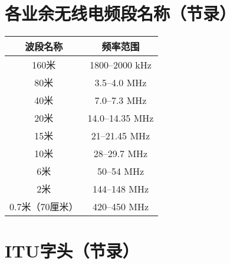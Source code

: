 \newpage






\section{各业余无线电频段名称（节录）}


\begin{longtable}{|c|c|}
	\hline
	\textbf{波段名称} & \textbf{频率范围} \\
	\hline
	160米 & 1800–2000 \si{\kHz} \\
	\hline
	80米 & 3.5–4.0 \si{\MHz} \\
	\hline
	40米 & 7.0–7.3 \si{\MHz} \\
	\hline
	20米 & 14.0–14.35 \si{\MHz} \\
	\hline
	15米 & 21–21.45 \si{\MHz} \\
	\hline
	10米 & 28–29.7 \si{\MHz} \\
	\hline
	6米 & 50–54 \si{\MHz} \\
	\hline
	2米 & 144–148 \si{\MHz} \\
	\hline
	0.7米（70厘米） & 420–450 \si{\MHz} \\
	\hline
\end{longtable}

\newpage








\section{ITU字头（节录）}


